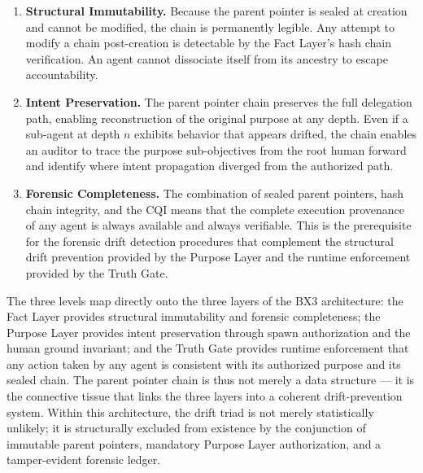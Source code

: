 \begin{enumerate}
    \item \textbf{Structural Immutability.} Because the parent pointer is sealed at creation and cannot be modified, the chain is permanently legible. Any attempt to modify a chain post-creation is detectable by the Fact Layer's hash chain verification. An agent cannot dissociate itself from its ancestry to escape accountability.
    \item \textbf{Intent Preservation.} The parent pointer chain preserves the full delegation path, enabling reconstruction of the original purpose at any depth. Even if a sub-agent at depth $n$ exhibits behavior that appears drifted, the chain enables an auditor to trace the purpose sub-objectives from the root human forward and identify where intent propagation diverged from the authorized path.
    \item \textbf{Forensic Completeness.} The combination of sealed parent pointers, hash chain integrity, and the CQI means that the complete execution provenance of any agent is always available and always verifiable. This is the prerequisite for the forensic drift detection procedures that complement the structural drift prevention provided by the Purpose Layer and the runtime enforcement provided by the Truth Gate.
\end{enumerate}

The three levels map directly onto the three layers of the BX3 architecture: the Fact Layer provides structural immutability and forensic completeness; the Purpose Layer provides intent preservation through spawn authorization and the human ground invariant; and the Truth Gate provides runtime enforcement that any action taken by any agent is consistent with its authorized purpose and its sealed chain. The parent pointer chain is thus not merely a data structure --- it is the connective tissue that links the three layers into a coherent drift-prevention system. Within this architecture, the drift triad is not merely statistically unlikely; it is structurally excluded from existence by the conjunction of immutable parent pointers, mandatory Purpose Layer authorization, and a tamper-evident forensic ledger.